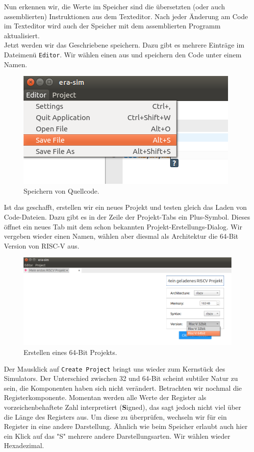 Nun erkennen wir, die Werte im Speicher sind die übersetzten (oder auch
assemblierten) Instruktionen aus dem Texteditor. Nach jeder Änderung am Code im
Texteditor wird auch der Speicher mit dem assemblierten Programm aktualisiert.\\
Jetzt werden wir das Geschriebene speichern. Dazu gibt es mehrere Einträge im
Dateimenü \texttt{Editor}. Wir wählen einen aus und speichern den Code unter
einem Namen.
\begin{figure}[H]
	\centering
	\includegraphics[scale=1.0]{Images/first-steps-7.png}
	\caption{Speichern von Quellcode.}
\end{figure}

Ist das geschafft, erstellen wir ein neues Projekt und testen gleich das
Laden von Code-Dateien. Dazu gibt es in der Zeile der Projekt-Tabs ein
Plus-Symbol. Dieses öffnet ein neues Tab mit dem schon bekannten
Projekt-Erstellungs-Dialog. Wir vergeben wieder einen Namen, wählen aber diesmal
als Architektur die 64-Bit Version von RISC-V aus.
\begin{figure}[H]
	\centering
	\includegraphics[scale=0.65]{Images/first-steps-8.png}
	\caption{Erstellen eines 64-Bit Projekts.}
\end{figure}

Der Mausklick auf \texttt{Create Project} bringt uns wieder zum Kernstück des
Simulators. Der Unterschied zwischen 32 und 64-Bit scheint subtiler Natur zu
sein, die Komponenten haben sich nicht verändert.  Betrachten wir nochmal die
Registerkomponente. Momentan werden alle Werte der Register als
vorzeichenbehaftete Zahl interpretiert (\textbf{S}igned), das sagt jedoch nicht
viel über die Länge des Registers aus. Um diese zu überprüfen, wechseln wir für
ein Register in eine andere Darstellung. Ähnlich wie beim Speicher erlaubt auch
hier ein Klick auf das "S" mehrere andere Darstellungsarten. Wir wählen wieder
Hexadezimal.

